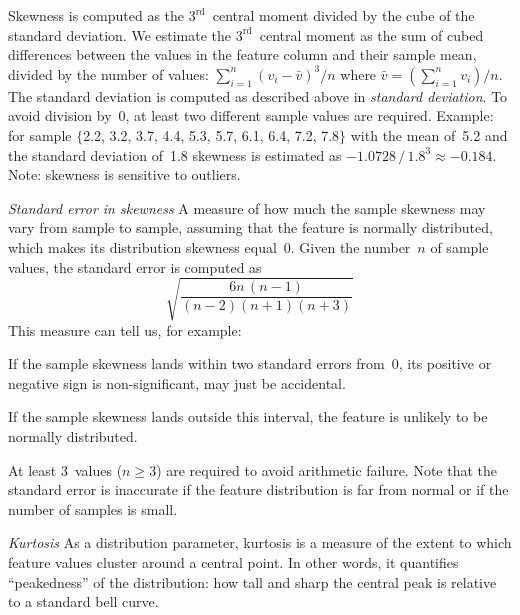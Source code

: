 \begin{Description}
Skewness is computed as the $3^{\textrm{rd}}$~central moment divided by the cube
of the standard deviation.  We estimate the $3^{\textrm{rd}}$~central moment as
the sum of cubed differences between the values in the feature column and their
sample mean, divided by the number of values:  
$\sum_{i=1}^n (v_i - \bar{v})^3 / n$
where $\bar{v}=\left(\sum_{i=1}^n v_i\right)\!/n$.
The standard deviation is computed
as described above in \emph{standard deviation}.  To avoid division by~0,
at least two different sample values are required.  Example: for sample
$\{$2.2, 3.2, 3.7, 4.4, 5.3, 5.7, 6.1, 6.4, 7.2, 7.8$\}$
with the mean of~5.2 and the standard deviation of~1.8
skewness is estimated as $-1.0728\,{/}\,1.8^3 \approx -0.184$.
Note: skewness is sensitive to outliers.
\item[\it Standard error in skewness]
\OutputRowText{\OutputRowIDStErrorSkewness}
A measure of how much the sample skewness may vary from sample to sample,
assuming that the feature is normally distributed, which makes its
distribution skewness equal~0.  
Given the number~$n$ of sample values, the standard error is computed as
\begin{equation*}
\sqrt{\frac{6n\,(n-1)}{(n-2)(n+1)(n+3)}}
\end{equation*}
This measure can tell us, for example:
\begin{Itemize}
\item If the sample skewness lands within two standard errors from~0, its
positive or negative sign is non-significant, may just be accidental.
\item If the sample skewness lands outside this interval, the feature
is unlikely to be normally distributed.
\end{Itemize}
At least 3~values ($n\geq 3$) are required to avoid arithmetic failure.
Note that the standard error is inaccurate if the feature distribution is
far from normal or if the number of samples is small.
\item[\it Kurtosis]
\OutputRowText{\OutputRowIDKurtosis}
As a distribution parameter, kurtosis is a measure of the extent to which
feature values cluster around a central point.  In other words, it quantifies
``peakedness'' of the distribution: how tall and sharp the central peak is
relative to a standard bell curve.


\end{Description}
